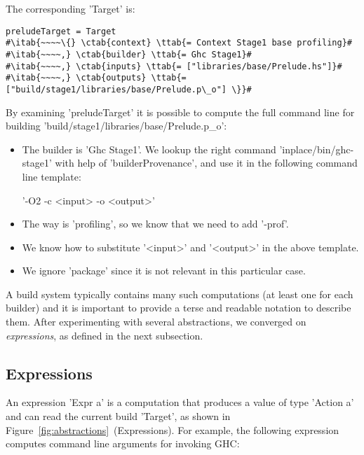 \noindent The corresponding \lst'Target' is:

\begin{lstlisting}
preludeTarget = Target
#\itab{~~~~\{} \ctab{context} \ttab{= Context Stage1 base profiling}#
#\itab{~~~~,} \ctab{builder} \ttab{= Ghc Stage1}#
#\itab{~~~~,} \ctab{inputs} \ttab{= ["libraries/base/Prelude.hs"]}#
#\itab{~~~~,} \ctab{outputs} \ttab{= ["build/stage1/libraries/base/Prelude.p\_o"] \}}#
\end{lstlisting}

\noindent By examining \lst'preludeTarget' it is possible to compute the full
command line for building \lst'build/stage1/libraries/base/Prelude.p_o':
\begin{itemize}
  \item The builder is \lst'Ghc Stage1'. We lookup the right command
  \lst'inplace/bin/ghc-stage1' with help of \lst'builderProvenance', and use it
  in the following command line template:\vspace{1mm}\\
  \centerline{\!\!\!\!\!\lst'-O2 -c <input> -o <output>'}
  \item The way is \lst'profiling', so we know that we need to add
  \lst'-prof'.
  \item We know how to substitute \lst'<input>' and \lst'<output>' in the
  above template.
  \item We ignore \lst'package' since it is not relevant in this particular
  case.
\end{itemize}

\noindent A build system typically contains many such computations (at least one
for each builder) and it is important to provide a terse and readable notation to
describe them. After experimenting with several abstractions, we converged on
\emph{expressions}, as defined in the next subsection.

\subsection{Expressions\label{sec:expressions}}

An expression \lst'Expr a' is a computation that produces a value of type
\lst'Action a' and can read the current build \lst'Target', as shown in
Figure~\ref{fig:abstractions}~(Expressions). For example,
the following expression computes command line arguments for invoking GHC:

\newcommand{\altab}[1]{\hspace{.05\textwidth}\rlap{#1}}

